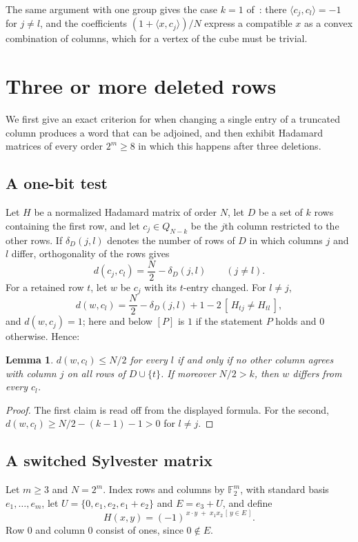 \documentclass[11pt]{amsart}
\newtheorem{lemma}[theorem]{Lemma}
\theoremstyle{remark}
\newcommand{\F}{\mathbb{F}_2}
\begin{document}
The same argument with one group gives the case $k=1$ of~\cite{BFW}: there $\langle c_j,c_l\rangle=-1$ for $j\ne l$,
and the coefficients $(1+\langle x,c_j\rangle)/N$ express a compatible $x$ as a convex combination of columns, which
for a vertex of the cube must be trivial.

\section{Three or more deleted rows}\label{sec:switch}

We first give an exact criterion for when changing a single entry of a truncated column produces a word that can be
adjoined, and then exhibit Hadamard matrices of every order $2^m\ge8$ in which this happens after three deletions.

\subsection{A one-bit test}
Let $H$ be a normalized Hadamard matrix of order $N$, let $D$ be a set of $k$ rows containing the first row, and let
$c_j\in Q_{N-k}$ be the $j$th column restricted to the other rows. If $\delta_D(j,l)$ denotes the number of rows of $D$
in which columns $j$ and $l$ differ, orthogonality of the rows gives
\[
d(c_j,c_l)=\frac N2-\delta_D(j,l)\qquad(j\ne l).
\]
For a retained row $t$, let $w$ be $c_j$ with its $t$-entry changed. For $l\ne j$,
\[
d(w,c_l)=\frac N2-\delta_D(j,l)+1-2\,[\,H_{tj}\ne H_{tl}\,],
\]
and $d(w,c_j)=1$; here and below $[P]$ is $1$ if the statement $P$ holds and $0$ otherwise. Hence:

\begin{lemma}\label{lem:flip}
$d(w,c_l)\le N/2$ for every $l$ if and only if no other column agrees with column $j$ on all rows of $D\cup\{t\}$.
If moreover $N/2>k$, then $w$ differs from every $c_l$.
\end{lemma}

\begin{proof}
The first claim is read off from the displayed formula. For the second, $d(w,c_l)\ge N/2-(k-1)-1>0$ for $l\ne j$.
\end{proof}

\subsection{A switched Sylvester matrix}
Let $m\ge3$ and $N=2^m$. Index rows and columns by $\F^m$, with standard basis $e_1,\dots,e_m$, let
$U=\{0,e_1,e_2,e_1+e_2\}$ and $E=e_3+U$, and define
\[
H(x,y)=(-1)^{\,x\cdot y\;+\;x_1x_2\,[\,y\in E\,]} .
\]
Row $0$ and column $0$ consist of ones, since $0\notin E$.
\end{document}
